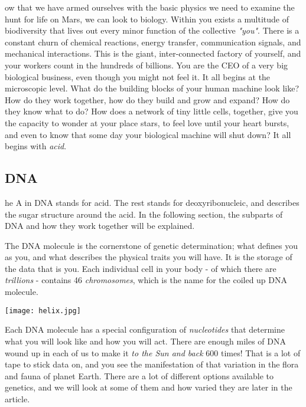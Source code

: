 ow that we have armed ourselves with the basic physics we need to examine the hunt for life on Mars, we can look to biology. 
Within you exists a multitude of biodiversity that lives out every minor function of the collective \emph{"you"}.
There is a constant churn of chemical reactions, energy transfer, communication signals, and mechanical interactions.
This is the giant, inter-connected factory of yourself, and your workers count in the hundreds of billions. 
You are the CEO of a very big biological business, even though you might not feel it.
It all begins at the microscopic level. 
What do the building blocks of your human machine look like?
How do they work together, how do they build and grow and expand?
How do they know what to do?
How does a network of tiny little cells, together, give you the capacity to wonder at your place stars, to feel love until your heart bursts, and even to know that some day your biological machine will shut down?
It all begins with \emph{acid}. 

\subsection{DNA}
he A in DNA stands for acid.
The rest stands for deoxyribonucleic, and describes the sugar structure around the acid.
In the following section, the subparts of DNA and how they work together will be explained.

The DNA molecule is the cornerstone of genetic determination; what defines you as you, and what describes the physical traits you will have.
It is the storage of the data that is you.
Each individual cell in your body - of which there are \emph{trillions} - contains 46 \emph{chromosomes}, which is the name for the coiled up DNA molecule.

\begin{center}
	\texttt{[image: helix.jpg]}
\end{center}

Each DNA molecule has a special configuration of \emph{nucleotides} that determine what you will look like and how you will act.\cite{pearson}
There are enough miles of DNA wound up in each of us to make it \emph{to the Sun and back} 600 times!
That is a lot of tape to stick data on, and you see the manifestation of that variation in the flora and fauna of planet Earth.
There are a lot of different options available to genetics, and we will look at some of them and how varied they are later in the article.

